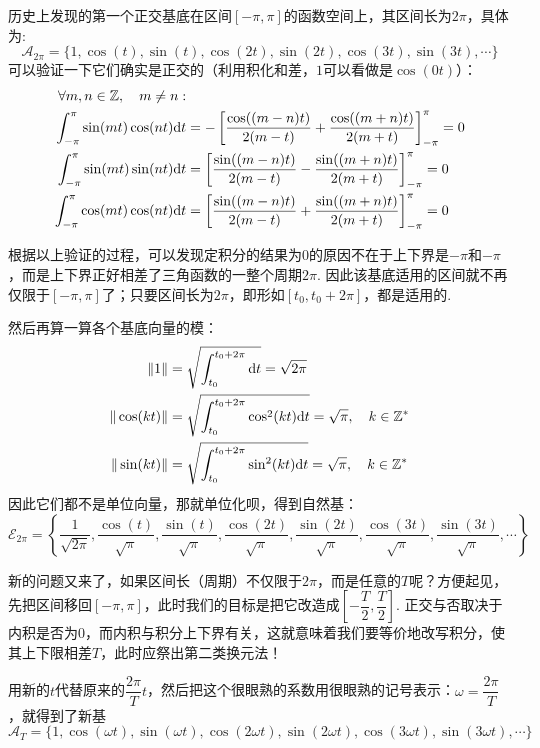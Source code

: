\documentclass[main.tex]{subfiles}
\begin{document}
历史上发现的第一个正交基底在区间\([-\pi,\pi]\)的函数空间上，其区间长为\(2\pi\)，具体为:
\[ \mathcal{A}_{2\pi} = \{ 1, \cos(t), \sin(t), \cos(2t), \sin(2t), \cos(3t), \sin(3t), \cdots \} \]
可以验证一下它们确实是正交的（利用积化和差，\(1\)可以看做是\(\cos(0t)\)）：
\begin{align*}
    \forall m,n\in \mathbb{Z},\quad m \neq n: & \\
    \int_{-\pi}^{\pi} \sin(mt)\cos(nt) {\rm d}t &= -\left[\frac{\cos((m-n)t)}{2(m-t)}+\frac{\cos((m+n)t)}{2(m+t)}\right]_{-\pi}^{\pi} = 0 \\
    \int_{-\pi}^{\pi} \sin(mt)\sin(nt) {\rm d}t &= \left[\frac{\sin((m-n)t)}{2(m-t)}-\frac{\sin((m+n)t)}{2(m+t)}\right]_{-\pi}^{\pi} = 0 \\
    \int_{-\pi}^{\pi} \cos(mt)\cos(nt) {\rm d}t &= \left[\frac{\sin((m-n)t)}{2(m-t)}+\frac{\sin((m+n)t)}{2(m+t)}\right]_{-\pi}^{\pi} = 0
\end{align*}

根据以上验证的过程，可以发现定积分的结果为\(0\)的原因不在于上下界是\(-\pi\)和\(-\pi\)，而是上下界正好相差了三角函数的一整个周期\(2\pi\). 因此该基底适用的区间就不再仅限于\([-\pi,\pi]\)了；只要区间长为\(2\pi\)，即形如\([t_0,t_0+2\pi]\)，都是适用的.

然后再算一算各个基底向量的模：
\begin{align*}
    \|1\| &= \sqrt{\int_{t_0}^{t_0+2\pi} {\rm d}t} = \sqrt{2\pi} \\
    \|\cos(kt)\| &= \sqrt{\int_{t_0}^{t_0+2\pi} \cos^2(kt) {\rm d}t} = \sqrt{\pi},\quad k \in \mathbb{Z}^* \\
    \|\sin(kt)\| &= \sqrt{\int_{t_0}^{t_0+2\pi} \sin^2(kt) {\rm d}t} = \sqrt{\pi},\quad k \in \mathbb{Z}^*
\end{align*}
因此它们都不是单位向量，那就单位化呗，得到自然基：
\[ \mathcal{E}_{2\pi} = \left\{ \frac{1}{\sqrt{2\pi}}, \frac{\cos(t)}{\sqrt{\pi}}, \frac{\sin(t)}{\sqrt{\pi}}, \frac{\cos(2t)}{\sqrt{\pi}}, \frac{\sin(2t)}{\sqrt{\pi}}, \frac{\cos(3t)}{\sqrt{\pi}}, \frac{\sin(3t)}{\sqrt{\pi}}, \cdots \right\} \]

新的问题又来了，如果区间长（周期）不仅限于\(2\pi\)，而是任意的\(T\)呢？方便起见，先把区间移回\([-\pi,\pi]\)，此时我们的目标是把它改造成\([-\dfrac{T}{2},\dfrac{T}{2}]\). 正交与否取决于内积是否为\(0\)，而内积与积分上下界有关，这就意味着我们要等价地改写积分，使其上下限相差\(T\)，此时应祭出第二类换元法！

用新的\(t\)代替原来的\(\dfrac{2\pi}{T}t\)，然后把这个很眼熟的系数用很眼熟的记号表示：\(\omega=\dfrac{2\pi}{T}\)，就得到了新基
\[ \mathcal{A}_{T} = \{ 1, \cos(\omega t), \sin(\omega t), \cos(2\omega t), \sin(2\omega t), \cos(3\omega t), \sin(3\omega t), \cdots \} \]
\end{document}
